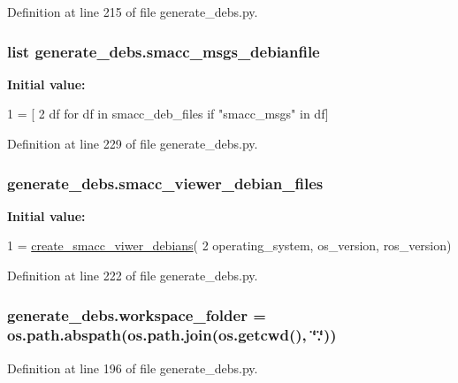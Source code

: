 Definition at line 215 of file generate\+\_\+debs.\+py.

\subsubsection[{\texorpdfstring{smacc\+\_\+msgs\+\_\+debianfile}{smacc_msgs_debianfile}}]{\setlength{\rightskip}{0pt plus 5cm}list generate\+\_\+debs.\+smacc\+\_\+msgs\+\_\+debianfile}\hypertarget{namespacegenerate__debs_aee54b2480a34decc910ca23b644951b7}{}\label{namespacegenerate__debs_aee54b2480a34decc910ca23b644951b7}
{\bfseries Initial value\+:}
\begin{DoxyCode}
1 = [
2         df \textcolor{keywordflow}{for} df \textcolor{keywordflow}{in} smacc\_deb\_files \textcolor{keywordflow}{if} \textcolor{stringliteral}{"smacc\_msgs"} \textcolor{keywordflow}{in} df]
\end{DoxyCode}


Definition at line 229 of file generate\+\_\+debs.\+py.

\subsubsection[{\texorpdfstring{smacc\+\_\+viewer\+\_\+debian\+\_\+files}{smacc_viewer_debian_files}}]{\setlength{\rightskip}{0pt plus 5cm}generate\+\_\+debs.\+smacc\+\_\+viewer\+\_\+debian\+\_\+files}\hypertarget{namespacegenerate__debs_a5d62bd0325adab581fa72927cb0a1ba8}{}\label{namespacegenerate__debs_a5d62bd0325adab581fa72927cb0a1ba8}
{\bfseries Initial value\+:}
\begin{DoxyCode}
1 = \hyperlink{namespacegenerate__debs_a1528f55b81a69cda3638628d37813bcf}{create\_smacc\_viwer\_debians}(
2         operating\_system, os\_version, ros\_version)
\end{DoxyCode}


Definition at line 222 of file generate\+\_\+debs.\+py.

\subsubsection[{\texorpdfstring{workspace\+\_\+folder}{workspace_folder}}]{\setlength{\rightskip}{0pt plus 5cm}generate\+\_\+debs.\+workspace\+\_\+folder = os.\+path.\+abspath(os.\+path.\+join(os.\+getcwd(), \char`\"{}.\char`\"{}))}\hypertarget{namespacegenerate__debs_acb69863b90257249a30e43ebacfb8bd8}{}\label{namespacegenerate__debs_acb69863b90257249a30e43ebacfb8bd8}


Definition at line 196 of file generate\+\_\+debs.\+py.

